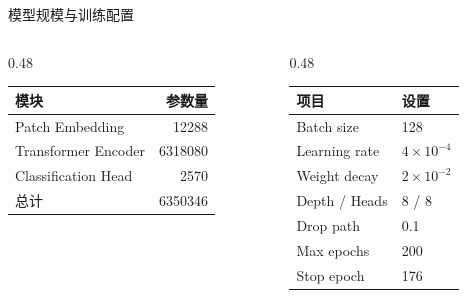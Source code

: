 \documentclass[aspectratio=169,10pt]{ctexbeamer}
\begin{document}
\begin{frame}{模型规模与训练配置}
	\begin{columns}[T,onlytextwidth]
		\begin{column}{0.48\textwidth}
			\begin{table}
				\centering
				\small
				\begin{tabular}{l r}
					\toprule
					模块 & 参数量 \\
					\midrule
					Patch Embedding & 12288 \\
					Transformer Encoder & 6318080 \\
					Classification Head & 2570 \\
					\midrule
					总计 & 6350346 \\
					\bottomrule
				\end{tabular}
			\end{table}
		\end{column}
		\begin{column}{0.48\textwidth}
			\begin{table}
				\centering
				\small
				\begin{tabular}{l l}
					\toprule
					项目 & 设置 \\
					\midrule
					Batch size & 128 \\
					Learning rate & $4\times10^{-4}$ \\
					Weight decay & $2\times10^{-2}$ \\
					Depth / Heads & 8 / 8 \\
					Drop path & 0.1 \\
					Max epochs & 200 \\
					Stop epoch & 176 \\
					\bottomrule
				\end{tabular}
			\end{table}
		\end{column}
	\end{columns}
\end{frame}
\end{document}

